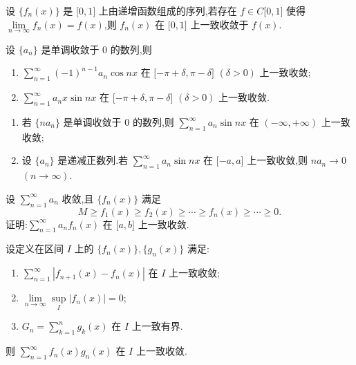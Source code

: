 \documentclass[../数学分析培优讲义.tex]{subfiles}
\begin{document}
\begin{example}
设 $\{f_n(x)\}$ 是 $\lbrack 0,1\rbrack$ 上由递增函数组成的序列,若存在 $f\in C\lbrack 0,1\rbrack$ 使得 $\displaystyle\lim\limits_{n\to\infty}f_n(x)=f(x)$,则 $f_n(x)$ 在 $\lbrack 0,1\rbrack$ 上一致收敛于 $f(x)$.
\end{example}
\exampleblank

\begin{example}
设 $\{a_n\}$ 是单调收敛于 $0$ 的数列,则
\begin{enumerate}[label=(\arabic*)]
    \item $\displaystyle\sum\limits_{n=1}^{\infty}(-1)^{n-1}a_n\cos nx$ 在 $\lbrack -\pi+\delta,\pi-\delta\rbrack$ $(\delta>0)$ 上一致收敛;
    \item $\displaystyle\sum\limits_{n=1}^{\infty}a_nx\sin nx$ 在 $\lbrack -\pi+\delta,\pi-\delta\rbrack$ $(\delta>0)$ 上一致收敛.
\end{enumerate}
\end{example}
\exampleblank

\begin{example}
\begin{enumerate}[label=(\arabic*)]
    \item 若 $\{na_n\}$ 是单调收敛于 $0$ 的数列,则 $\displaystyle\sum\limits_{n=1}^{\infty}a_n\sin nx$ 在 $(-\infty,+\infty)$ 上一致收敛;
    \item 设 $\{a_n\}$ 是递减正数列.若 $\displaystyle\sum\limits_{n=1}^{\infty}a_n\sin nx$ 在 $\lbrack -a,a\rbrack$ 上一致收敛,则 $na_n\to0$ $(n\to\infty)$.
\end{enumerate}
\end{example}
\exampleblank

\begin{example}
设 $\displaystyle\sum\limits_{n=1}^{\infty}a_n$ 收敛,且 $\{f_n(x)\}$ 满足
\[
    M\geq f_1(x)\geq f_2(x)\geq\cdots\geq f_n(x)\geq\cdots\geq0.
\]
证明:$\displaystyle\sum\limits_{n=1}^{\infty}a_nf_n(x)$ 在 $\lbrack a,b\rbrack$ 上一致收敛.
\end{example}
\exampleblank

\begin{example}
设定义在区间 $I$ 上的 $\{f_n(x)\},\{g_n(x)\}$ 满足:
\begin{enumerate}[label=(\arabic*)]
    \item $\displaystyle\sum\limits_{n=1}^{\infty}|f_{n+1}(x)-f_n(x)|$ 在 $I$ 上一致收敛;
    \item $\displaystyle\lim\limits_{n\to\infty}\sup\limits_I|f_n(x)|=0$;
    \item $G_n=\displaystyle\sum\limits_{k=1}^n g_k(x)$ 在 $I$ 上一致有界.
\end{enumerate}
则 $\displaystyle\sum\limits_{n=1}^{\infty}f_n(x)g_n(x)$ 在 $I$ 上一致收敛.
\end{example}
\exampleblank
\end{document}
